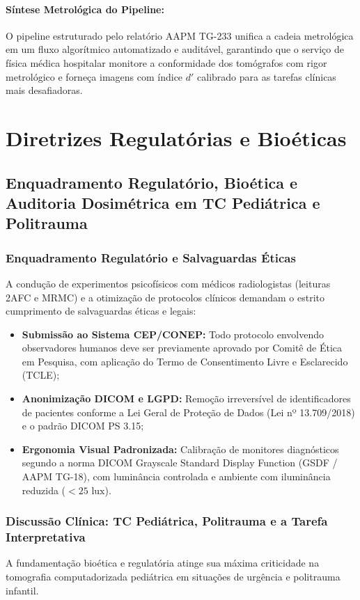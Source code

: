 \documentclass[
  12pt,
  a4paper,
  oneside
]{report}
\begin{document}
\paragraph{Síntese Metrológica do Pipeline:} O pipeline estruturado pelo relatório AAPM TG-233 unifica a cadeia metrológica em um fluxo algorítmico automatizado e auditável, garantindo que o serviço de física médica hospitalar monitore a conformidade dos tomógrafos com rigor metrológico e forneça imagens com índice $d'$ calibrado para as tarefas clínicas mais desafiadoras.

\section{Diretrizes Regulatórias e Bioéticas}
\label{sec:bioetica_regulacao}

\subsection{Enquadramento Regulatório, Bioética e Auditoria Dosimétrica em TC Pediátrica e Politrauma}
\label{subsec:bioetica_regulacao_pediatria_consolidada}

\subsubsection{Enquadramento Regulatório e Salvaguardas Éticas}
A condução de experimentos psicofísicos com médicos radiologistas (leituras 2AFC e MRMC) e a otimização de protocolos clínicos demandam o estrito cumprimento de salvaguardas éticas e legais:
\begin{itemize}
  \item \textbf{Submissão ao Sistema CEP/CONEP:} Todo protocolo envolvendo observadores humanos deve ser previamente aprovado por Comitê de Ética em Pesquisa, com aplicação do Termo de Consentimento Livre e Esclarecido (TCLE);
  \item \textbf{Anonimização DICOM e LGPD:} Remoção irreversível de identificadores de pacientes conforme a Lei Geral de Proteção de Dados (Lei nº 13.709/2018) e o padrão DICOM PS 3.15;
  \item \textbf{Ergonomia Visual Padronizada:} Calibração de monitores diagnósticos segundo a norma DICOM Grayscale Standard Display Function (GSDF / AAPM TG-18), com luminância controlada e ambiente com iluminância reduzida ($< 25\text{ lux}$).
\end{itemize}

\subsubsection{Discussão Clínica: TC Pediátrica, Politrauma e a Tarefa Interpretativa}
A fundamentação bioética e regulatória atinge sua máxima criticidade na tomografia computadorizada pediátrica em situações de urgência e politrauma infantil.
\end{document}
